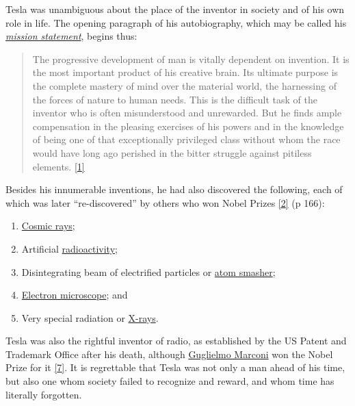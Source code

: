 \documentclass[
  12pt,
  british,
  a4paper,
  rgb,
  dvipsnames,
  svgnames,
  hyphens]{article}
\providecommand{\tightlist}{%
  \setlength{\itemsep}{0pt}\setlength{\parskip}{0pt}}
\begin{document}
Tesla was unambiguous about the place of the inventor in society and of
his own role in life. The opening paragraph of his autobiography, which
may be called his
\href{https://en.wikipedia.org/wiki/Mission_statement}{\emph{mission
statement}}, begins thus:

\begin{quote}
The progressive development of man is vitally dependent on invention. It
is the most important product of his creative brain. Its ultimate
purpose is the complete mastery of mind over the material world, the
harnessing of the forces of nature to human needs. This is the difficult
task of the inventor who is often misunderstood and unrewarded. But he
finds ample compensation in the pleasing exercises of his powers and in
the knowledge of being one of that exceptionally privileged class
without whom the race would have long ago perished in the bitter
struggle against pitiless elements.
\protect\hyperlink{ref-john83}{{[}1{]}}
\end{quote}

Besides his innumerable inventions, he had also discovered the
following, each of which was later ``re-discovered'' by others who won
Nobel Prizes \protect\hyperlink{ref-oneill80}{{[}2{]}} (p 166):

\begin{enumerate}
\tightlist
\item
  \href{https://en.wikipedia.org/wiki/Cosmic_ray}{Cosmic rays};
\item
  Artificial
  \href{https://www.britannica.com/science/radioactivity}{radioactivity};
\item
  Disintegrating beam of electrified particles or
  \href{https://en.wikipedia.org/wiki/Particle_accelerator}{atom
  smasher};
\item
  \href{https://en.wikipedia.org/wiki/Electron_microscope}{Electron
  microscope}; and
\item
  Very special radiation or
  \href{https://en.wikipedia.org/wiki/X-ray}{X-rays}.
\end{enumerate}

Tesla was also the rightful inventor of radio, as established by the US
Patent and Trademark Office after his death, although
\href{https://en.wikipedia.org/wiki/Guglielmo_Marconi}{Guglielmo
Marconi} won the Nobel Prize for it
\protect\hyperlink{ref-tesla-home}{{[}7{]}}. It is regrettable that
Tesla was not only a man ahead of his time, but also one whom society
failed to recognize and reward, and whom time has literally forgotten.
\end{document}
